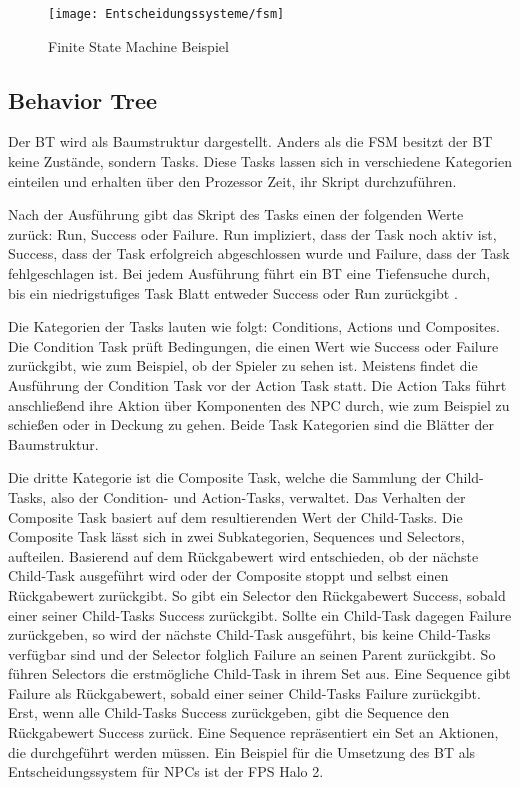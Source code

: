 \begin{figure}[h]
  \centering
  \texttt{[image: Entscheidungssysteme/fsm]}
	\captionsetup{justification=justified, format=plain}
  \caption{Finite State Machine Beispiel}
  \label{fig:ES FSM}
\end{figure}


\subsection{Behavior Tree}
\label{chap:bt}

Der BT wird als Baumstruktur dargestellt. Anders als die FSM besitzt der BT keine Zust\"{a}nde, sondern Tasks. Diese Tasks lassen sich in verschiedene Kategorien einteilen und erhalten \"{u}ber den Prozessor Zeit, ihr Skript durchzuf\"{u}hren.

Nach der Ausf\"{u}hrung gibt das Skript des Tasks einen der folgenden Werte zur\"{u}ck: Run, Success oder Failure. Run impliziert, dass der Task noch aktiv ist, Success, dass der Task erfolgreich abgeschlossen wurde und Failure, dass der Task fehlgeschlagen ist. Bei jedem Ausf\"{u}hrung f\"{u}hrt ein BT eine Tiefensuche durch, bis ein niedrigstufiges Task Blatt entweder Success oder Run zur\"{u}ckgibt \autocite{qlbt}.

Die Kategorien der Tasks lauten wie folgt: Conditions, Actions und Composites. Die Condition Task pr\"{u}ft Bedingungen, die einen Wert wie Success oder Failure zur\"{u}ckgibt, wie zum Beispiel, ob der Spieler zu sehen ist. Meistens findet die Ausf\"{u}hrung der Condition Task vor der Action Task statt. Die Action Taks f\"{u}hrt anschlie\ss{}end ihre Aktion \"{u}ber Komponenten des NPC durch, wie zum Beispiel zu schie\ss{}en oder in Deckung zu gehen. Beide Task Kategorien sind die Bl\"{a}tter der Baumstruktur.

Die dritte Kategorie ist die Composite Task, welche die Sammlung der Child-Tasks, also der Condition- und Action-Tasks, verwaltet. Das Verhalten der Composite Task basiert auf dem resultierenden Wert der Child-Tasks. Die Composite Task l\"{a}sst sich in zwei Subkategorien, Sequences und Selectors, aufteilen. Basierend auf dem R\"{u}ckgabewert wird entschieden, ob der n\"{a}chste Child-Task ausgef\"{u}hrt wird oder der Composite stoppt und selbst einen R\"{u}ckgabewert zur\"{u}ckgibt. So gibt ein Selector den R\"{u}ckgabewert Success, sobald einer seiner Child-Tasks Success zur\"{u}ckgibt. Sollte ein Child-Task dagegen Failure zur\"{u}ckgeben, so wird der n\"{a}chste Child-Task ausgef\"{u}hrt, bis keine Child-Tasks verf\"{u}gbar sind und der Selector folglich Failure an seinen Parent zur\"{u}ckgibt. So f\"{u}hren Selectors die erstm\"{o}gliche Child-Task in ihrem Set aus. Eine Sequence gibt Failure als R\"{u}ckgabewert, sobald einer seiner Child-Tasks Failure zur\"{u}ckgibt. Erst, wenn alle Child-Tasks Success zur\"{u}ckgeben, gibt die Sequence den R\"{u}ckgabewert Success zur\"{u}ck. Eine Sequence repr\"{a}sentiert ein Set an Aktionen, die durchgef\"{u}hrt werden m\"{u}ssen. Ein Beispiel f\"{u}r die Umsetzung des BT als Entscheidungssystem f\"{u}r NPCs ist der FPS Halo 2. \autocite{AIgames, review_game_ai}

